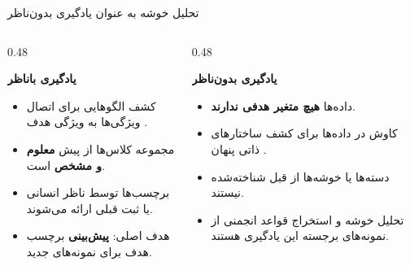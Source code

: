 \begin{frame}{تحلیل خوشه به عنوان یادگیری بدون‌ناظر}{}
  \begin{columns}[T]
    \begin{column}{0.48\textwidth}
      \begin{block}{\textbf{یادگیری با‌ناظر }}
        \begin{itemize}
          \setlength{\itemsep}{3pt}
          \item کشف الگوهایی برای اتصال ویژگی‌ها به ویژگی هدف .
          \item مجموعه کلاس‌ها از پیش \textbf{معلوم و مشخص} است.
          \item برچسب‌ها توسط ناظر انسانی یا ثبت قبلی ارائه می‌شوند.
          \item هدف اصلی: \textbf{پیش‌بینی} برچسب هدف برای نمونه‌های جدید.
        \end{itemize}
      \end{block}
    \end{column}
    \begin{column}{0.48\textwidth}
      \begin{block}{\textbf{یادگیری بدون‌ناظر }}
        \begin{itemize}
          \setlength{\itemsep}{3pt}
          \item داده‌ها \textbf{هیچ متغیر هدفی ندارند}.
          \item کاوش در داده‌ها برای کشف ساختارهای ذاتی پنهان .
          \item دسته‌ها یا خوشه‌ها از قبل شناخته‌شده نیستند.
          \item تحلیل خوشه و استخراج قواعد انجمنی از نمونه‌های برجسته این یادگیری هستند.
        \end{itemize}
      \end{block}
    \end{column}
  \end{columns}
\end{frame}

